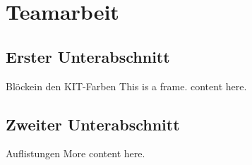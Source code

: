 \section{Teamarbeit}

\subsection{Erster Unterabschnitt}
\begin{frame}{Blöcke}{in den KIT-Farben}
    This is a frame. content here.
\end{frame}

\subsection{Zweiter Unterabschnitt}
\begin{frame}{Auflistungen}
    More content here.
\end{frame}
